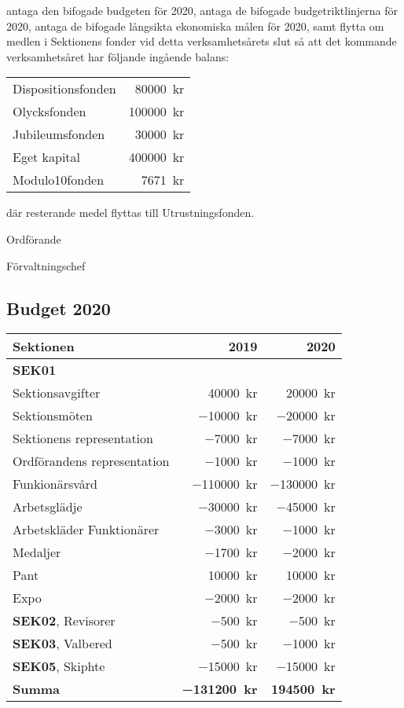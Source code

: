 \documentclass[../_main/handlingar.tex]{subfiles}
\begin{document}
\begin{attsatser}
    \att antaga den bifogade budgeten för 2020, 
    \att antaga de bifogade budgetriktlinjerna för 2020,
    \att antaga de bifogade långsikta ekonomiska målen för 2020, samt
    \att flytta om medlen i Sektionens fonder vid detta verksamhetsårets slut så att det kommande verksamhetsåret har följande ingående balans:\par
    \begin{tabular}{l r}
        Dispositionsfonden & \SI{80000}{kr}\\
        Olycksfonden & \SI{100000}{kr}\\
        Jubileumsfonden & \SI{30000}{kr}\\
        Eget kapital & \SI{400000}{kr}\\
        Modulo10fonden & \SI{7671}{kr}\\
    \end{tabular}\par
    där resterande medel flyttas till Utrustningsfonden.
\end{attsatser}

\begin{signatures}{2}
    \ist
    \signature{\ordf}{Ordförande}
    \signature{\fvc}{Förvaltningschef}
\end{signatures}

\newpage
\subsection*{Budget 2020}
\begin{tabularx}{10cm}{X r r}
    \textbf{\large Sektionen} & \textbf{2019} & \textbf{2020} \\
    \hline
    \textbf{SEK01} \\
    Sektionsavgifter & \SI{40000}{kr} & \SI{20000}{kr} \\
    Sektionsmöten & \SI{-10000}{kr} & \SI{-20000}{kr} \\
    Sektionens representation & \SI{-7000}{kr} & \SI{-7000}{kr} \\
    Ordförandens representation & \SI{-1000}{kr} & \SI{-1000}{kr} \\
    Funkionärsvård & \SI{-110000}{kr} & \SI{-130000}{kr} \\
    Arbetsglädje & \SI{-30000}{kr} & \SI{-45000}{kr} \\
    Arbetskläder Funktionärer & \SI{-3000}{kr} & \SI{-1000}{kr} \\
    Medaljer & \SI{-1700}{kr} & \SI{-2000}{kr} \\
    Pant & \SI{10000}{kr} & \SI{10000}{kr} \\
    Expo & \SI{-2000}{kr} & \SI{-2000}{kr} \\
    \textbf{SEK02}, Revisorer & \SI{-500}{kr} & \SI{-500}{kr} \\
    \textbf{SEK03}, Valbered & \SI{-500}{kr} & \SI{-1000}{kr} \\
    \textbf{SEK05}, Skiphte & \SI{-15000}{kr} & \SI{-15000}{kr} \\
    \hline
    \textbf{Summa} & \textbf{\SI{-131200}{kr}} & \textbf{\SI{194500}{kr}} \\
\end{tabularx}
\end{document}
